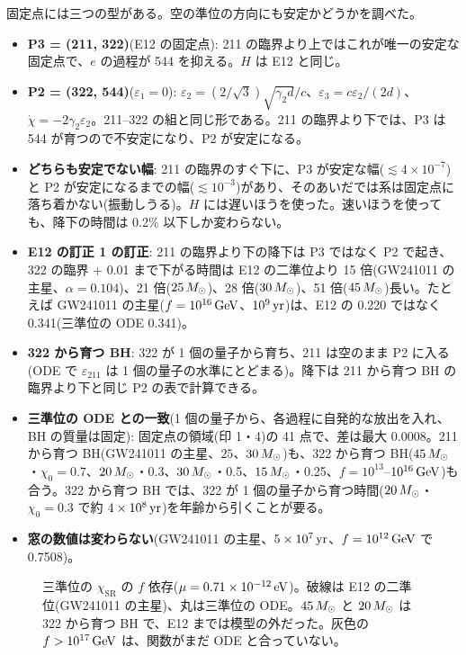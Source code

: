 固定点には三つの型がある。空の準位の方向にも安定かどうかを調べた。
\begin{itemize}
\item \textbf{P3 = (211, 322)}(E12 の固定点): 211 の臨界より上ではこれが唯一の安定な固定点で、$e$ の過程が 544 を抑える。$H$ は E12 と同じ。
\item \textbf{P2 = (322, 544)}($\varepsilon_1=0$): $\varepsilon_2=(2/\sqrt3)\sqrt{\gamma_2d}/c$、$\varepsilon_3=c\varepsilon_2/(2d)$、$\dot\chi=-2\gamma_2\varepsilon_2$。211--322 の組と同じ形である。211 の臨界より下では、P3 は 544 が育つので不安定になり、P2 が安定になる。
\item \textbf{どちらも安定でない幅}: 211 の臨界のすぐ下に、P3 が安定な幅($\lesssim4\times10^{-7}$)と P2 が安定になるまでの幅($\lesssim10^{-3}$)があり、そのあいだでは系は固定点に落ち着かない(振動しうる)。$H$ には遅いほうを使った。速いほうを使っても、降下の時間は 0.2\% 以下しか変わらない。
\end{itemize}

\begin{result}
\begin{itemize}
\item \textbf{E12 の訂正 1 の訂正}: 211 の臨界より下の降下は P3 ではなく P2 で起き、322 の臨界 + 0.01 まで下がる時間は E12 の二準位より 15 倍(GW241011 の主星、$\alpha=0.104$)、21 倍($25\,M_\odot$)、28 倍($30\,M_\odot$)、51 倍($45\,M_\odot$)長い。たとえば GW241011 の主星($f=10^{16}\,\mathrm{GeV}$、$10^9\,\mathrm{yr}$)は、E12 の 0.220 ではなく 0.341(三準位の ODE 0.341)。
\item \textbf{322 から育つ BH}: 322 が 1 個の量子から育ち、211 は空のまま P2 に入る(ODE で $\varepsilon_{211}$ は 1 個の量子の水準にとどまる)。降下は 211 から育つ BH の臨界より下と同じ P2 の表で計算できる。
\item \textbf{三準位の ODE との一致}(1 個の量子から、各過程に自発的な放出を入れ、BH の質量は固定): 固定点の領域(印 1・4)の 41 点で、差は最大 0.0008。211 から育つ BH(GW241011 の主星、$25$、$30\,M_\odot$)も、322 から育つ BH($45\,M_\odot$・$\chi_0=0.7$、$20\,M_\odot$・0.3、$30\,M_\odot$・0.5、$15\,M_\odot$・0.25、$f=10^{13}$--$10^{16}\,\mathrm{GeV}$)も合う。322 から育つ BH では、322 が 1 個の量子から育つ時間($20\,M_\odot$・$\chi_0=0.3$ で約 $4\times10^8\,\mathrm{yr}$)を年齢から引くことが要る。
\item \textbf{窓の数値は変わらない}(GW241011 の主星、$5\times10^7\,\mathrm{yr}$、$f=10^{12}\,\mathrm{GeV}$ で 0.7508)。
\end{itemize}
\end{result}

\begin{figure}[H]
\centering

\caption{三準位の $\chi_\mathrm{SR}$ の $f$ 依存($\mu=0.71\times10^{-12}\,\mathrm{eV}$)。破線は E12 の二準位(GW241011 の主星)、丸は三準位の ODE。$45\,M_\odot$ と $20\,M_\odot$ は 322 から育つ BH で、E12 までは模型の外だった。灰色の $f>10^{17}\,\mathrm{GeV}$ は、関数がまだ ODE と合っていない。}
\label{fig:e14}
\end{figure}

